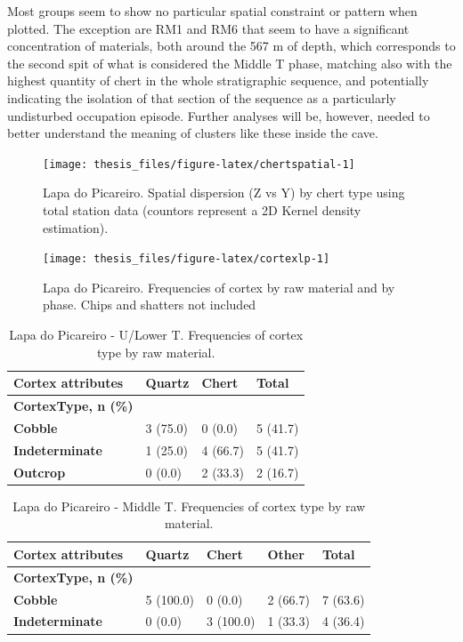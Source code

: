 \documentclass[12pt,twoside]{reedthesis}
\begin{document}
Most groups seem to show no particular spatial constraint or pattern when plotted. The exception are RM1 and RM6 that seem to have a significant concentration of materials, both around the 567 m of depth, which corresponds to the second spit of what is considered the Middle T phase, matching also with the highest quantity of chert in the whole stratigraphic sequence, and potentially indicating the isolation of that section of the sequence as a particularly undisturbed occupation episode. Further analyses will be, however, needed to better understand the meaning of clusters like these inside the cave.
\begin{figure}[H]

{\centering \texttt{[image: thesis\_files/figure-latex/chertspatial-1]} 

}

\caption{Lapa do Picareiro. Spatial dispersion (Z vs Y) by chert type using total station data (countors represent a 2D Kernel density estimation).}\label{fig:chertspatial}
\end{figure}
\begin{figure}[H]

{\centering \texttt{[image: thesis\_files/figure-latex/cortexlp-1]} 

}

\caption{Lapa do Picareiro. Frequencies of cortex by raw material and by phase. Chips and shatters not included}\label{fig:cortexlp}
\end{figure}
\begin{table}[!h]

\caption{\label{tab:cortextabtg}Lapa do Picareiro - U/Lower T. Frequencies of cortex type by raw material.}
\centering
\fontsize{9}{11}\selectfont
\begin{tabular}[t]{>{\bfseries}llll}
\toprule
Cortex attributes & Quartz & Chert & Total\\
\midrule
CortexType, n (\%) &  &  & \\
Cobble & 3 (75.0) & 0 (0.0) & 5 (41.7)\\
Indeterminate & 1 (25.0) & 4 (66.7) & 5 (41.7)\\
Outcrop & 0 (0.0) & 2 (33.3) & 2 (16.7)\\
\bottomrule
\end{tabular}
\end{table}
\begin{table}[!h]

\caption{\label{tab:cortextabpr}Lapa do Picareiro - Middle T. Frequencies of cortex type by raw material.}
\centering
\fontsize{9}{11}\selectfont
\begin{tabular}[t]{>{\bfseries}lllll}
\toprule
Cortex attributes & Quartz & Chert & Other & Total\\
\midrule
CortexType, n (\%) &  &  &  & \\
Cobble & 5 (100.0) & 0 (0.0) & 2 (66.7) & 7 (63.6)\\
Indeterminate & 0 (0.0) & 3 (100.0) & 1 (33.3) & 4 (36.4)\\
\bottomrule
\end{tabular}
\end{table}
\end{document}
